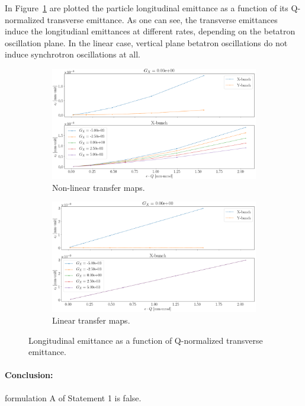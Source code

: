 In Figure~\ref{fig:long_emitt_vs_trans_emitt} are plotted the particle longitudinal emittance as a
function of its Q-normalized transverse emittance. As one can see, the transverse emittances induce
the longitudianl emittances at different rates, depending on the betatron oscillation plane.
In the linear case, vertical plane betatron oscillations do not induce synchrotron oscillations at all.
\begin{figure}[h]
\centering
\begin{subfigure}{\linewidth}
\includegraphics[height=.3\paperheight]{images/stune_traj_equ/part1/long_emitt_vs_trans_emitt}
\caption{Non-linear transfer maps.}
\end{subfigure}
\begin{subfigure}{\linewidth}
\includegraphics[height=.3\paperheight]{images/stune_traj_equ/part1/long_emitt_vs_trans_emitt_linear}
\caption{Linear transfer maps.}
\end{subfigure}
\caption{Longitudinal emittance as a function of
Q-normalized transverse emittance.\label{fig:long_emitt_vs_trans_emitt}}
\end{figure}

\paragraph{Conclusion:} formulation A of Statement 1 is false. 
